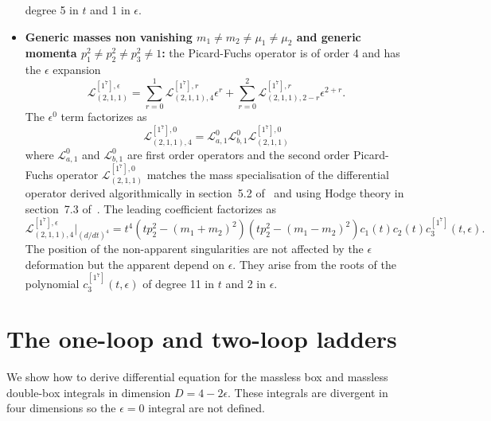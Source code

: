 \documentclass[a4paper,12pt]{article}
\numberwithin{equation}{section}
\numberwithin{figure}{section}
\begin{document}
\begin{itemize}
                 degree 5 in $t$ and 1 in $\epsilon$.
  \item \textbf{Generic masses non vanishing
  $m_1\neq m_2\neq\mu_1\neq\mu_2$ and generic
  momenta  $p_1^2\neq p_2^2\neq
  p_3^2\neq 1$:}  the Picard-Fuchs operator is of order 4 and has the
  $\epsilon$ expansion
   \begin{equation}
       \mathscr{L}_{(2,1,1)}^{[1^7],\epsilon}=\sum_{r=0}^1
       \mathscr{L}_{(2,1,1),4}^{[1^7],r} \epsilon^r+ \sum_{r=0}^2
       \mathscr{L}_{(2,1,1),2-r}^{[1^7],r} \epsilon^{2+r}.
     \end{equation}
     The
     $\epsilon^0$ term factorizes as
     \begin{equation}
           \mathscr{L}_{(2,1,1),4}^{[1^7],0}=\mathscr{L}_{a,1}^0 \mathscr{L}_{b,1}^0 \mathscr{L}_{(2,1,1)}^{[1^7] ,0      }
         \end{equation}
         where $\mathscr{L}_{a,1}^0$ and  $\mathscr{L}_{b,1}^0$ are
         first order operators and  the second order
         Picard-Fuchs operator  $\mathscr{L}_{(2,1,1)}^{[1^7] ,0}
         $ matches the mass specialisation of the differential
         operator derived algorithmically in section~5.2
         of~\cite{Lairez:2022zkj} and using Hodge theory in
         section~7.3 of~\cite{Doran:2023yzu}.
         The leading coefficient factorizes as
         \begin{equation}
                     \mathscr{L}_{(2,1,1),4}^{[1^7],\epsilon}\Big|_{(d/dt)^4}=t^4
                     (tp_2^2-(m_1+m_2)^2)(tp_2^2-(m_1-m_2)^2) c_1(t)
                     c_2(t) c^{[1^7]}_3(t,\epsilon)   .
                   \end{equation}
                 The position of the non-apparent singularities are
                 not affected by the $\epsilon$ deformation but the
                 apparent depend on $\epsilon$. They arise from the
                 roots of the polynomial $c^{[1^7]}_3(t,\epsilon) $ of
                 degree 11 in $t$ and 2 in $\epsilon$.
\end{itemize}
\section{The one-loop and two-loop ladders}

We show how to derive differential equation for  the massless box and massless double-box integrals in 
dimension $D=4-2\epsilon$. These integrals are divergent in four
dimensions so the $\epsilon=0$ integral are not defined.
\end{document}
